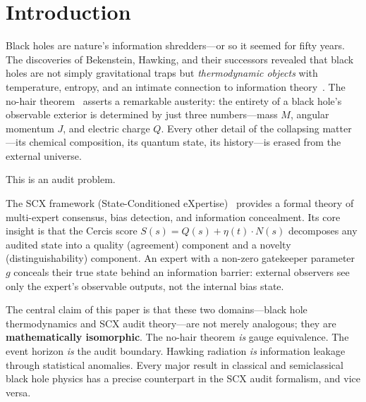 \documentclass[12pt,a4paper]{article}
\theoremstyle{remark}
\newcommand{\SCX}{\textsf{SCX}}
\newcommand{\Cercis}{\textsf{Cercis}}
\begin{document}
\begin{abstract}
We derive the \textbf{Cercis bound} $C_{\max} = \frac{1}{4} \cdot \frac{\|g\|^2}{\varepsilon^2}$ in exact analogy to $S = A/4\ell_P^2$, prove that the Hawking evaporation timescale $t_{\text{evap}} \sim M^3$ maps to the bias detection timescale $t_{\text{detect}} \sim \|g\|^3$, and show that the generalized second law $\Delta S_{\text{BH}} + \Delta S_{\text{matter}} \geq 0$ is equivalent to the \SCX{} audit monotonicity condition $\Delta C_{\max} + \Delta I_{\text{accessible}} \geq 0$. A complete numerical verification suite is provided in \texttt{verify\_black\_hole.py}.
\end{abstract}


\section{Introduction}

Black holes are nature's information shredders---or so it seemed for fifty years. The discoveries of Bekenstein, Hawking, and their successors revealed that black holes are not simply gravitational traps but \emph{thermodynamic objects} with temperature, entropy, and an intimate connection to information theory~\cite{bekenstein1973black,hawking1976black,bardeen1973four}. The no-hair theorem~\cite{israel1967event,carter1971axisymmetric,robinson1975uniqueness} asserts a remarkable austerity: the entirety of a black hole's observable exterior is determined by just three numbers---mass $M$, angular momentum $J$, and electric charge $Q$. Every other detail of the collapsing matter---its chemical composition, its quantum state, its history---is erased from the external universe.

This is an audit problem.

The \SCX{} framework (State-Conditioned eXpertise)~\cite{scx_theory} provides a formal theory of multi-expert consensus, bias detection, and information concealment. Its core insight is that the \Cercis{} score $S(s) = Q(s) + \eta(t) \cdot N(s)$ decomposes any audited state into a quality (agreement) component and a novelty (distinguishability) component. An expert with a non-zero gatekeeper parameter $g$ conceals their true state behind an information barrier: external observers see only the expert's observable outputs, not the internal bias state.

The central claim of this paper is that these two domains---black hole thermodynamics and \SCX{} audit theory---are not merely analogous; they are \textbf{mathematically isomorphic}. The no-hair theorem \emph{is} gauge equivalence. The event horizon \emph{is} the audit boundary. Hawking radiation \emph{is} information leakage through statistical anomalies. Every major result in classical and semiclassical black hole physics has a precise counterpart in the \SCX{} audit formalism, and vice versa.
\end{document}

